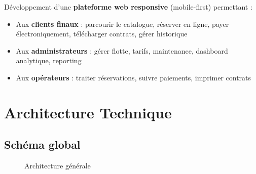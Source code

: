\documentclass[12pt, a4paper]{article}
\begin{document}
Développement d'une \textbf{plateforme web responsive} (mobile-first) permettant :
\begin{itemize}[leftmargin=*,noitemsep]
  \item Aux \textbf{clients finaux} : parcourir le catalogue, réserver en ligne, payer électroniquement, télécharger contrats, gérer historique
  \item Aux \textbf{administrateurs} : gérer flotte, tarifs, maintenance, dashboard analytique, reporting
  \item Aux \textbf{opérateurs} : traiter réservations, suivre paiements, imprimer contrats
\end{itemize}

\section{Architecture Technique}

\subsection{Schéma global}

\begin{figure}[h]
  \centering
  \caption{Architecture générale}
\end{figure}
\end{document}
